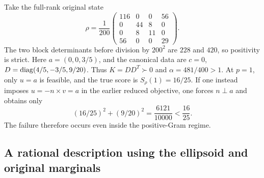 \begin{remark}
\label{rem:r3-counterexample}
Take the full-rank original state
\begin{equation}
 \rho=\frac1{200}
 \begin{pmatrix}
 116&0&0&56\\0&44&8&0\\0&8&11&0\\56&0&0&29
 \end{pmatrix}.
 \label{eq:r3-counterexample}
\end{equation}
The two block determinants before division by $200^2$ are $228$ and
$420$, so positivity is strict. Here $a=(0,0,3/5)$, and the canonical
data are $c=0$, $D=\operatorname{diag}(4/5,-3/5,9/20)$.
Thus $K=DD^T\succ0$ and $\alpha=481/400>1$.
At $p=1$, only $u=a$ is feasible, and the true score is
$S_\rho(1)=16/25$.
If one instead imposes $u=-n\times v=a$ in the earlier reduced
objective, one forces $n\perp a$ and obtains only
\[
 (16/25)^2+(9/20)^2=\frac{6121}{10000}
 <\frac{16}{25}.
\]
The failure therefore occurs even inside the positive-Gram regime.
\end{remark}

\subsection{A rational description using the ellipsoid and original marginals}

